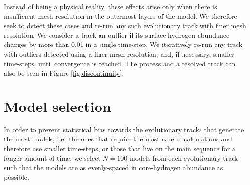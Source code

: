 \documentclass[manuscript]{aastex}
\begin{document}
Instead of being a physical reality, these effects arise only when there is insufficient mesh resolution in the outermost layers of the model. We therefore seek to detect these cases and re-run any such evolutionary track with finer mesh resolution. We consider a track an outlier if its surface hydrogen abundance changes by more than 0.01 in a single time-step. We iteratively re-run any track with outliers detected using a finer mesh resolution, and, if necessary, smaller time-steps, until convergence is reached. The process and a resolved track can also be seen in Figure \ref{fig:discontinuity}. 





\section{Model selection}
\label{sec:selection}
In order to prevent statistical bias towards the evolutionary tracks that generate the most models, i.e.~the ones that require the most careful calculations and therefore use smaller time-steps, or those that live on the main sequence for a longer amount of time; we select $N=100$ models from each evolutionary track such that the models are as evenly-spaced in core-hydrogen abundance as possible. 
\end{document}
